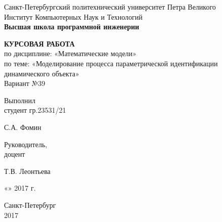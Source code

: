 \thispagestyle{empty}

\begin{center}
    Санкт-Петербургский политехнический университет Петра Великого\\
    Институт Компьютерных Наук и Технологий\\
    \bfseries{Высшая школа программной инженерии}
\end{center}

\vspace{20ex}

\begin{center}
    {
    \LARGE \textbf{КУРСОВАЯ РАБОТА} \\[3ex]
    по дисциплине: «Математические модели» \\
    по теме: «Моделирование процесса параметрической идентификации динамического объекта» \\[3ex]
    Вариант №39
    }
\end{center}

\vspace{40ex}

\noindent Выполнил\\
студент гр.23531/21\hfill
\begin{minipage}{0.7\textwidth}
    \hfill \uline{\hspace{3cm}} \hspace{1.1cm} С.А. Фомин
\end{minipage}

\vspace{3ex}

\noindent Руководитель,\\
доцент\hfill
\begin{minipage}{0.7\textwidth}
    \hfill \uline{\hspace{3cm}} \hspace{0.5cm} Т.В. Леонтьева
\end{minipage}

\vspace{3ex}

\hfill \begin{minipage}{0.6\textwidth} \hfill «\uline{\hspace{1cm}}»\uline{\hspace{3cm}} 2017 г.\end{minipage}

\vfill

\begin{center}
    Санкт-Петербург\\
    2017
\end{center}

